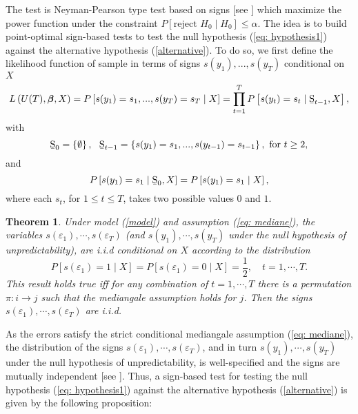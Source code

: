 \documentclass[harvard,11pt]{article}
\newtheorem{theorem}{Theorem}
\begin{document}
The test is Neyman-Pearson type test based on signs [see \citet{lehmann2006testing}] which maximize the
power function under the constraint $P\left[ \text{reject }%
H_{0}\mid H_{0}\right] \leq \alpha$. The idea is to build		
point-optimal sign-based tests to test the null hypothesis (\ref{eq:
hypothesis1}) against the alternative hypothesis (\ref{alternative}). To do
so, we first define the likelihood function of sample in terms of signs $%
s(y_{1}),...,s(y_{T})$ conditional on $X$%
\begin{equation*}
L\left( U(T),\bm{\beta}, X \right) =P\left[
s(y_{1})=s_{1},...,s(y_{T})=s_{T}\mid X\right] =\prod\limits_{t=1}^{T} P\left[ s(y_{t})=s_{t}\mid \text{\b{S}}_{t-1}, X\right] ,
\end{equation*}%
with 
\begin{equation*}
\text{\b{S}}_{0}=\left\{ \emptyset \right\} ,\text{ \ \b{S}}_{t-1}=\left\{
s(y_{1})=s_{1},...,s(y_{t-1})=s_{t-1}\right\} ,\text{ for }t\geq 2,
\end{equation*}%
and%
\begin{equation*}
P\left[ s(y_{1})=s_{1}\mid \text{\b{S}}_{0},X\right] =P%
\left[ s(y_{1})=s_{1}\mid X\right] ,
\end{equation*}%
where each $s_{t}$, for $1\leq t\leq T$, takes two possible values $0$ and $1
$. 


\begin{theorem}\label{Theorem1}
Under model (\ref{model}) and assumption (\ref{eq: mediane}), the variables $s(\varepsilon_1),\cdots,s(\varepsilon_T)$ (and $s(y_1),\cdots,s(y_T)$ under the null hypothesis of unpredictability), are i.i.d conditional on $X$ according to the distribution
\[
P[s(\varepsilon_1)=1\mid X]=P[s(\varepsilon_1)=0\mid X]=\frac{1}{2},\quad t=1,\cdots,T.
\]
This result holds true iff for any combination of $t=1,\cdots,T$ there is a permutation $\pi: i\rightarrow j$ such that the mediangale assumption holds for $j$. Then the signs $s(\varepsilon_1),\cdots,s(\varepsilon_T)$ are i.i.d.

\end{theorem}  As the errors satisfy the strict conditional mediangale assumption (\ref{eq: mediane}), the distribution of the signs $s(\varepsilon_1),\cdots,s(\varepsilon_T)$, and in turn $s(y_1),\cdots, s(y_T)$ under the null hypothesis of unpredictability, is well-specified and the signs are mutually independent [see \citet{coudin2009finite}]. Thus, a sign-based test for testing the null hypothesis (\ref{eq: hypothesis1})
against the alternative hypothesis (\ref{alternative}) is given by the
following proposition:
\end{document}
